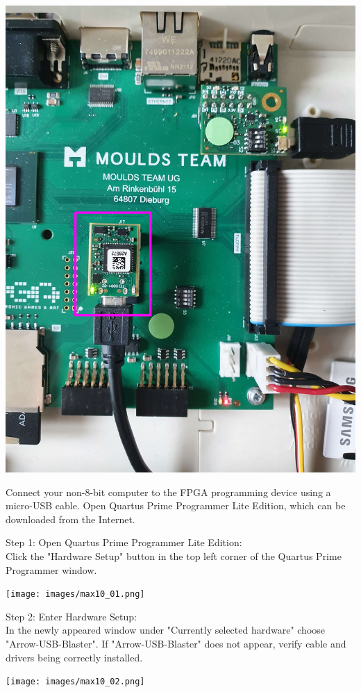 \includegraphics[width=\linewidth]{images/jtag_detail_max10.png}

Connect your non-8-bit computer to the FPGA programming device using a micro-USB cable.
Open Quartus Prime Programmer Lite Edition, which can be downloaded from the Internet.

\begin{minipage}{\linewidth}
Step 1: Open Quartus Prime Programmer Lite Edition: \\
Click the "Hardware Setup" button in the top left corner of
the Quartus Prime Programmer window.
  \begin{center}
  \texttt{[image: images/max10\_01.png]}
  \end{center}
\end{minipage}

\vspace{5mm}

\begin{minipage}{\linewidth}
Step 2: Enter Hardware Setup: \\
In the newly appeared window under "Currently selected
hardware" choose "Arrow-USB-Blaster".
If "Arrow-USB-Blaster" does not appear, verify cable and
drivers being correctly installed.
  \begin{center}
  \texttt{[image: images/max10\_02.png]}
  \end{center}
\end{minipage}


